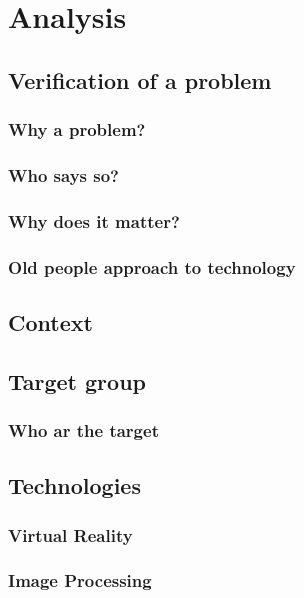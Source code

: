 \chapter{Analysis}
	
	
	\section{Verification of a problem}\label{sec:verification}
		\subsection{Why a problem?}
		
		\subsection{Who says so?}
		
		\subsection{Why does it matter?}
		
		\subsection{Old people approach to technology}


	\section{Context}
	
	\section{Target group}\label{sec:targetGroup}
		\subsection{Who ar the target }
	\section{Technologies}\label{sec:technologies}
		\subsection{Virtual Reality}
		\subsection{Image Processing}
